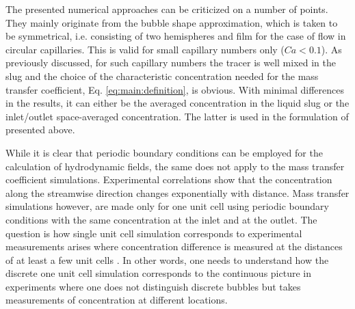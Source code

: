 \documentclass{article}
\begin{document}
The presented numerical approaches \cite{vanbaten-circular,kreutzer-overview}
can be criticized on a number of points. They mainly
originate from the bubble shape approximation, which is taken to be symmetrical, i.e.
consisting of two hemispheres and film for the case of flow in circular
capillaries. This is valid  for small capillary numbers only ($Ca<0.1$). As previously
discussed, for such capillary numbers the tracer is well mixed in the slug and 
the choice of the characteristic concentration needed for the mass transfer
coefficient, Eq. \ref{eq:main:definition}, is obvious. With minimal
differences in the results, it can either be the averaged concentration in the liquid slug
or the inlet/outlet space-averaged concentration. The latter is used in the formulation
of \citet{vanbaten-circular} presented above. 

While it is clear that periodic boundary conditions can be employed for the calculation
 of hydrodynamic fields, the same does not apply to the mass transfer coefficient
simulations. Experimental correlations \cite{bercic-mass} show that the
concentration along the streamwise direction changes exponentially with distance.
Mass transfer simulations however, are made only for one unit cell
using periodic boundary conditions with the same concentration at the inlet
and at the outlet. The question is how single unit cell simulation corresponds to
experimental measurements arises where concentration difference is measured at
the distances of at least a few unit cells \cite{bercic-mass}. In
other words, one needs to understand how the discrete one unit cell simulation
corresponds to the continuous picture in experiments where one does not
distinguish discrete bubbles but takes measurements of concentration at different
locations.
\end{document}
